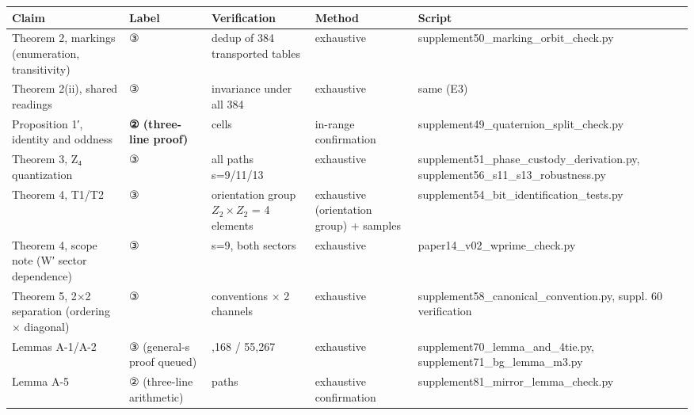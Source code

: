 \documentclass[
]{article}
\newcounter{none} %
\begin{document}
{\def\LTcaptype{none} %
\begin{longtable}[]{@{}
  >{\raggedright\arraybackslash}p{}
  >{\raggedright\arraybackslash}p{}
  >{\raggedright\arraybackslash}p{}
  >{\raggedright\arraybackslash}p{}
  >{\raggedright\arraybackslash}p{}@{}}
\toprule\noalign{}
\begin{minipage}[b]{\linewidth}\raggedright
Claim
\end{minipage} & \begin{minipage}[b]{\linewidth}\raggedright
Label
\end{minipage} & \begin{minipage}[b]{\linewidth}\raggedright
Verification
\end{minipage} & \begin{minipage}[b]{\linewidth}\raggedright
Method
\end{minipage} & \begin{minipage}[b]{\linewidth}\raggedright
Script
\end{minipage} \\
\midrule\noalign{}
\endhead
\bottomrule\noalign{}
\endlastfoot
Theorem 2, markings (enumeration, transitivity) & ③ & dedup of 384
transported tables & exhaustive &
supplement50\_marking\_orbit\_check.py \\
Theorem 2(ii), shared readings & ③ & invariance under all 384 &
exhaustive & same (E3) \\
Proposition 1′, identity and oddness & \textbf{② (three-line proof)} &
6561 cells & in-range confirmation &
supplement49\_quaternion\_split\_check.py \\
Theorem 3, Z₄ quantization & ③ & all paths s=9/11/13 & exhaustive &
supplement51\_phase\_custody\_derivation.py,
supplement56\_s11\_s13\_robustness.py \\
Theorem 4, T1/T2 & ③ & orientation group \(Z_2\times Z_2\) = 4 elements
& exhaustive (orientation group) + samples &
supplement54\_bit\_identification\_tests.py \\
Theorem 4, scope note (W′ sector dependence) & ③ & s=9, both sectors &
exhaustive & paper14\_v02\_wprime\_check.py \\
Theorem 5, 2×2 separation (ordering × diagonal) & ③ & 4 conventions × 2
channels & exhaustive & supplement58\_canonical\_convention.py, suppl.
60 verification \\
Lemmas A-1/A-2 & ③ (general-s proof queued) & 103,168 / 55,267 &
exhaustive & supplement70\_lemma\_and\_4tie.py,
supplement71\_bg\_lemma\_m3.py \\
Lemma A-5 & ② (three-line arithmetic) & 394 paths & exhaustive
confirmation & supplement81\_mirror\_lemma\_check.py \\
\end{longtable}
}
\end{document}
